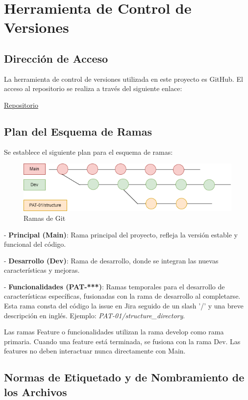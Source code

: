 \section{Herramienta de Control de Versiones}

\subsection{Dirección de Acceso}\label{sec:repo-git}
La herramienta de control de versiones utilizada en este proyecto es GitHub. El acceso al repositorio se realiza a través del siguiente enlace:


\hyperlink{https://github.com/orgs/proyecto-patrocinio/repositories}{Repositorio}


\subsection{Plan del Esquema de Ramas}
Se establece el siguiente plan para el esquema de ramas:


\begin{figure}[h]
    \centering
    \includegraphics[width=1\linewidth]{fig/branches.png}
    \caption{Ramas de Git}
    \label{fig:enter-label}
\end{figure}


- \textbf{Principal (Main)}: Rama principal del proyecto, refleja la versión estable y funcional del código.
  
- \textbf{Desarrollo (Dev)}: Rama de desarrollo, donde se integran las nuevas características y mejoras.

- \textbf{Funcionalidades (PAT-***)}: Ramas temporales para el desarrollo de características específicas, fusionadas con la rama de desarrollo al completarse.
Esta rama consta del código la issue en Jira seguido de un slash '/' y una breve descripción en inglés. Ejemplo: \textit{PAT-01/structure\_directory}.

Las ramas Feature o funcionalidades utilizan la rama develop como rama primaria. Cuando una feature está terminada, se fusiona con la rama Dev. Las features no deben interactuar nunca directamente con Main.

\subsection{Normas de Etiquetado y de Nombramiento de los Archivos}

